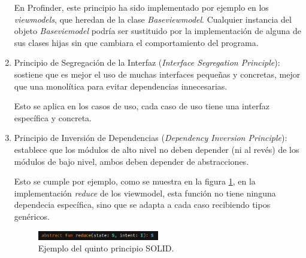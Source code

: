 \begin{enumerate}
    En Profinder, este principio ha sido implementado por ejemplo en los \textit{viewmodels}, que heredan de la clase \textit{Baseviewmodel}. Cualquier instancia del objeto \textit{Baseviemodel} podría ser sustituido por la implementación de alguna de sus clases hijas sin que cambiara el comportamiento del programa.
    \item Principio de Segregación de la Interfaz (\textit{Interface Segregation Principle}):  sostiene que es mejor el uso de muchas interfaces pequeñas y concretas, mejor que una monolítica para evitar dependencias innecesarias.
    
    Esto se aplica en los casos de uso, cada caso de uso tiene una interfaz específica y concreta.
    \item Principio de Inversión de Dependencias (\textit{Dependency Inversion Principle}): establece que los módulos de alto nivel no deben depender (ni al revés) de los módulos de bajo nivel, ambos deben depender de abstracciones.
    
    Esto se cumple por ejemplo, como se muestra en la figura \ref{fig:ejemplo_reduce}, en la implementación \textit{reduce} de los viewmodel, esta función no tiene ninguna dependecia específica, sino que se adapta a cada caso recibiendo tipos genéricos.
    \begin{figure}[h]
        \centering
        \includegraphics[width = 0.5\textwidth]{Imagenes/Fuentes/ejemplo_reduce.png}
        \caption{Ejemplo del quinto principio SOLID.}
        \label{fig:ejemplo_reduce}
    \end{figure}
\end{enumerate}

